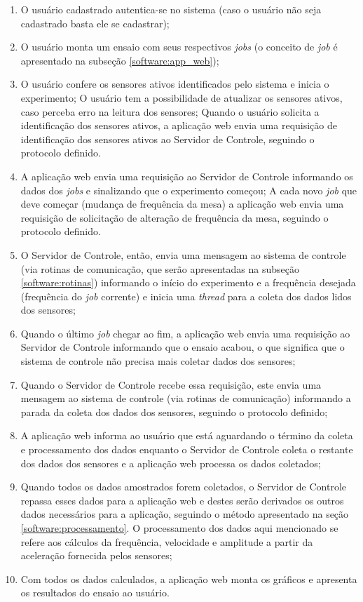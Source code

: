 \begin{enumerate}
 \item O usuário cadastrado autentica-se no sistema (caso o usuário não seja cadastrado basta ele se cadastrar);
 \item O usuário monta um ensaio com seus respectivos \textit{jobs} (o conceito de \textit{job} é apresentado na subseção \ref{software:app_web});
 \item O usuário confere os sensores ativos identificados pelo sistema e inicia o experimento;
    \subitem O usuário tem a possibilidade de atualizar os sensores ativos, caso perceba erro na leitura dos sensores;
    \subitem Quando o usuário solicita a identificação dos sensores ativos, a aplicação web envia uma requisição
         de identificação dos sensores ativos ao Servidor de Controle, seguindo o protocolo definido.
 \item A aplicação web envia uma requisição ao Servidor de Controle informando os dados dos \textit{jobs} 
        e sinalizando que o experimento começou;
       \subitem A cada novo \textit{job} que deve começar (mudança de frequência da mesa) a aplicação web envia uma requisição
       de solicitação de alteração de frequência da mesa, seguindo o protocolo definido.
 \item O Servidor de Controle, então, envia uma mensagem ao sistema de controle (via rotinas de comunicação,
       que serão apresentadas na subseção \ref{software:rotinas}) informando o início do experimento e a frequência
       desejada (frequência do \textit{job} corrente) e inicia uma \textit{thread} para a coleta dos dados lidos dos sensores;
 \item Quando o último \textit{job} chegar ao fim, a aplicação web envia uma requisição ao Servidor de Controle informando
       que o ensaio acabou, o que significa que o sistema de controle não precisa mais coletar dados dos sensores;
 \item Quando o Servidor de Controle recebe essa requisição, este envia uma mensagem ao sistema de controle (via rotinas de comunicação)
       informando a parada da coleta dos dados dos sensores, seguindo o protocolo definido;
 \item A aplicação web informa ao usuário que está aguardando o término da coleta e processamento dos dados enquanto o Servidor de
       Controle coleta o restante dos dados dos sensores e a aplicação web processa os dados coletados;
 \item Quando todos os dados amostrados forem coletados, o Servidor de Controle repassa esses dados para a aplicação web e
       destes serão derivados os outros dados necessários para a aplicação, seguindo 
       o método apresentado na seção \ref{software:processamento}. O processamento dos dados aqui mencionado se refere aos cálculos da frequência,
       velocidade e amplitude a partir da aceleração fornecida pelos sensores;
 \item Com todos os dados calculados, a aplicação web monta os gráficos e apresenta os resultados do ensaio ao usuário.
\end{enumerate}


